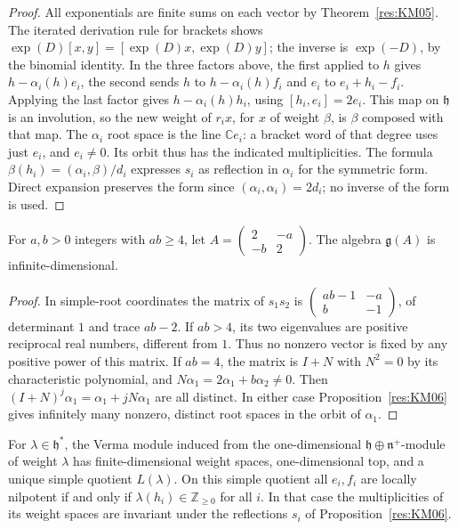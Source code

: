 \begin{proof}
All exponentials are finite sums on each vector by
Theorem~\ref{res:KM05}. The iterated derivation rule for brackets
shows \(\exp(D)[x,y]=[\exp(D)x,\exp(D)y]\); the inverse is
\(\exp(-D)\), by the binomial identity. In the three factors above,
the first applied to \(h\) gives \(h-\alpha_i(h)e_i\),
the second sends \(h\) to \(h-\alpha_i(h)f_i\) and \(e_i\) to
\(e_i+h_i-f_i\). Applying the last factor gives \(h-\alpha_i(h)h_i\),
using \([h_i,e_i]=2e_i\). This map on \(\mathfrak h\) is an
involution, so the new weight of \(r_i x\), for \(x\) of
weight \(\beta\), is \(\beta\) composed with that map. The
\(\alpha_i\) root space is the line \(\mathbb C e_i\): a bracket
word of that degree uses just \(e_i\), and \(e_i\ne0\).
Its orbit thus has the indicated multiplicities. The formula
\(\beta(h_i)= (\alpha_i,\beta)/d_i\) expresses \(s_i\) as
reflection in \(\alpha_i\) for the symmetric form. Direct
expansion preserves the form since
\((\alpha_i,\alpha_i)=2d_i\); no inverse of the form is used.
\end{proof}

\begin{example}
\label{res:KM07}
For \(a,b>0\) integers with \(ab\ge4\), let
\(A=\left(\begin{smallmatrix}2&-a\\-b&2\end{smallmatrix}\right)\).
The algebra \(\mathfrak g(A)\) is infinite-dimensional.
\end{example}

\begin{proof}
In simple-root coordinates the matrix of \(s_1s_2\) is
\(\left(\begin{smallmatrix}ab-1&-a\\ b&-1\end{smallmatrix}\right)\),
of determinant \(1\) and trace \(ab-2\). If \(ab>4\), its
two eigenvalues are positive reciprocal real numbers, different
from \(1\). Thus no nonzero vector is fixed by any positive
power of this matrix. If \(ab=4\), the matrix is \(I+N\) with
\(N^2=0\) by its characteristic polynomial, and
\(N\alpha_1=2\alpha_1+b\alpha_2\ne0\).
Then \((I+N)^j\alpha_1=\alpha_1+jN\alpha_1\) are all distinct.
In either case Proposition~\ref{res:KM06} gives infinitely many
nonzero, distinct root spaces in the orbit of \(\alpha_1\).
\end{proof}

\begin{theorem}
\label{res:KM08}
For \(\lambda\in\mathfrak h^*\), the Verma module induced from the
one-dimensional \(\mathfrak h\oplus\mathfrak n^+\)-module of
weight \(\lambda\) has finite-dimensional weight spaces,
one-dimensional top, and a unique simple quotient \(L(\lambda)\).
On this simple quotient all \(e_i,f_i\) are locally nilpotent
if and only if \(\lambda(h_i)\in\mathbb Z_{\ge0}\) for all \(i\).
In that case the multiplicities of its weight spaces are invariant
under the reflections \(s_i\) of Proposition~\ref{res:KM06}.
\end{theorem}

